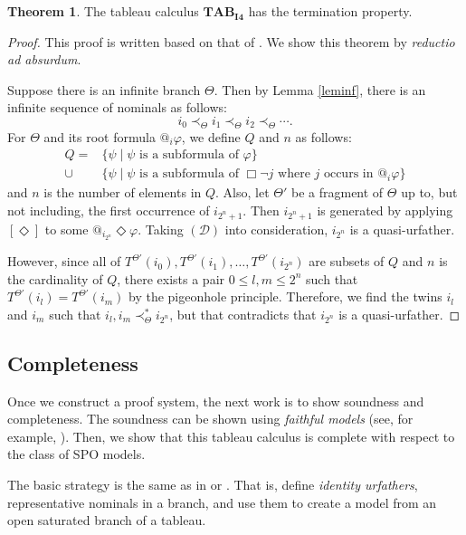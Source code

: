 \documentclass{article}
\theoremstyle{definition}
\newtheorem{theorem}[definition]{Theorem}
\newcommand{\Dia}{\Diamond}
\newcommand{\Drest}{(\mathcal{D})}
\newcommand{\tableauIF}{\mathbf{TAB}_{\mathbf{I4}}}
\begin{document}
\begin{theorem}
    The tableau calculus $\tableauIF$ has the termination property.
    \label{thmtermI4}
\end{theorem}
\begin{proof}
  This proof is written based on that of \cite[Theorem 5.8]{bolander2007}. We show this theorem by \textit{reductio ad absurdum}.

  Suppose there is an infinite branch $\Theta$. Then by Lemma \ref{leminf}, there is an infinite sequence of nominals as follows:
  \[
    i_0 \prec_\Theta i_1 \prec_\Theta i_2 \prec_\Theta \cdots .
  \]
  For $\Theta$ and its root formula $@_i \varphi$, we define $Q$ and $n$ as follows:
  \begin{align*}
      Q = &\{ \psi \mid \psi \text{ is a subformula of } \varphi \} \\
      \cup &\{ \psi \mid \psi \text{ is a subformula of } \Box \neg j \text{ where } j \text{ occurs in } @_i \varphi \}
  \end{align*}
  and $n$ is the number of elements in $Q$. Also, let $\Theta'$ be a fragment of $\Theta$ up to, but not including, the first occurrence of $i_{2^n + 1}$. Then $i_{2^n + 1}$ is generated by applying $[\Dia]$ to some $@_{i_{2^n}} \Dia \varphi$. Taking $\Drest$ into consideration, $i_{2^n}$ is a quasi-urfather.

  However, since all of $T^{\Theta'}(i_0), T^{\Theta'}(i_1), \ldots, T^{\Theta'}(i_{2^n})$ are subsets of $Q$ and $n$ is the cardinality of $Q$, there exists a pair $0 \leq l, m \leq 2^n$ such that $T^{\Theta'}(i_l) = T^{\Theta'}(i_m)$ by the pigeonhole principle. Therefore, we find the twins $i_l$ and $i_m$ such that $i_l, i_m \prec_\Theta^* i_{2^n}$, but that contradicts that $i_{2^n}$ is a quasi-urfather.
\end{proof}

\subsection{Completeness}

Once we construct a proof system, the next work is to show soundness and completeness. The soundness can be shown using \emph{faithful models} (see, for example, \cite{nishimura2024}). Then, we show that this tableau calculus is complete with respect to the class of SPO models.

The basic strategy is the same as in \cite[Section 5.2]{bolander2007} or \cite[Section 3.3]{nishimura2025}. That is, define \emph{identity urfathers}, representative nominals in a branch, and use them to create a model from an open saturated branch of a tableau.
\end{document}
